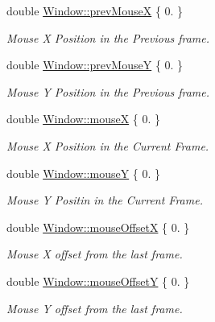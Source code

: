 \begin{DoxyCompactItemize}
double \mbox{\hyperlink{group___getters_gad50401a5c3c350b562b9577106e60fb0}{Window\+::prev\+MouseX}} \{ 0. \}
\begin{DoxyCompactList}\small\item\em Mouse X Position in the Previous frame. \end{DoxyCompactList}\item 
\mbox{\label{group___getters_gaf4a58a8da45b8aeeb36dbcae237bcef4}} 
double \mbox{\hyperlink{group___getters_gaf4a58a8da45b8aeeb36dbcae237bcef4}{Window\+::prev\+MouseY}} \{ 0. \}
\begin{DoxyCompactList}\small\item\em Mouse Y Position in the Previous frame. \end{DoxyCompactList}\item 
\mbox{\label{group___getters_ga68f752a9e5c04cf32a50b169df0de609}} 
double \mbox{\hyperlink{group___getters_ga68f752a9e5c04cf32a50b169df0de609}{Window\+::mouseX}} \{ 0. \}
\begin{DoxyCompactList}\small\item\em Mouse X Position in the Current Frame. \end{DoxyCompactList}\item 
\mbox{\label{group___getters_ga9f5f64a77451ba45212dab398f7b9dac}} 
double \mbox{\hyperlink{group___getters_ga9f5f64a77451ba45212dab398f7b9dac}{Window\+::mouseY}} \{ 0. \}
\begin{DoxyCompactList}\small\item\em Mouse Y Positin in the Current Frame. \end{DoxyCompactList}\item 
\mbox{\label{group___getters_ga93b50aa557f493c5589af5dcc8f74c4a}} 
double \mbox{\hyperlink{group___getters_ga93b50aa557f493c5589af5dcc8f74c4a}{Window\+::mouse\+OffsetX}} \{ 0. \}
\begin{DoxyCompactList}\small\item\em Mouse X offset from the last frame. \end{DoxyCompactList}\item 
\mbox{\label{group___getters_ga22d84e6f9e9c7e283f303798b630c733}} 
double \mbox{\hyperlink{group___getters_ga22d84e6f9e9c7e283f303798b630c733}{Window\+::mouse\+OffsetY}} \{ 0. \}
\begin{DoxyCompactList}\small\item\em Mouse Y offset from the last frame. \end{DoxyCompactList}\end{DoxyCompactItemize}


